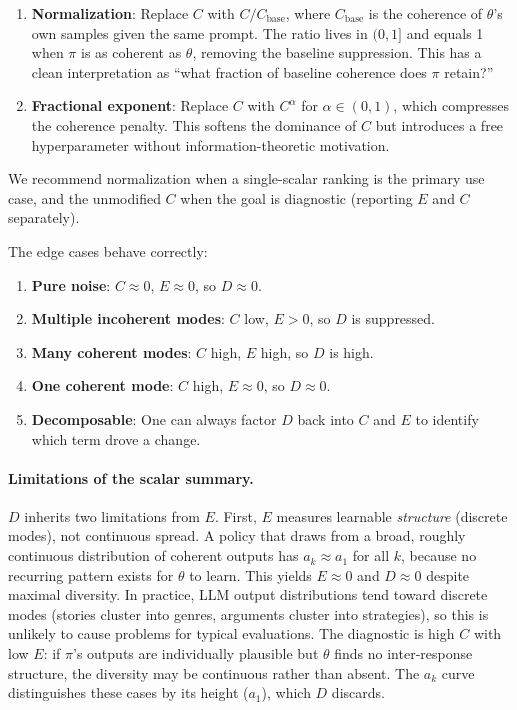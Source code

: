 \documentclass[11pt]{article}
\begin{document}
\begin{enumerate}[nosep]
    \item \textbf{Normalization}: Replace $C$ with $C / C_{\mathrm{base}}$, where $C_{\mathrm{base}}$ is the coherence of $\theta$'s own samples given the same prompt. The ratio lives in $(0, 1]$ and equals 1 when $\pi$ is as coherent as $\theta$, removing the baseline suppression. This has a clean interpretation as ``what fraction of baseline coherence does $\pi$ retain?''
    \item \textbf{Fractional exponent}: Replace $C$ with $C^\alpha$ for $\alpha \in (0, 1)$, which compresses the coherence penalty. This softens the dominance of $C$ but introduces a free hyperparameter without information-theoretic motivation.
\end{enumerate}

We recommend normalization when a single-scalar ranking is the primary use case, and the unmodified $C$ when the goal is diagnostic (reporting $E$ and $C$ separately).

The edge cases behave correctly:
\begin{enumerate}[nosep]
    \item \textbf{Pure noise}: $C \approx 0$, $E \approx 0$, so $D \approx 0$.
    \item \textbf{Multiple incoherent modes}: $C$ low, $E > 0$, so $D$ is suppressed.
    \item \textbf{Many coherent modes}: $C$ high, $E$ high, so $D$ is high.
    \item \textbf{One coherent mode}: $C$ high, $E \approx 0$, so $D \approx 0$.
    \item \textbf{Decomposable}: One can always factor $D$ back into $C$ and $E$ to identify which term drove a change.
\end{enumerate}

\paragraph{Limitations of the scalar summary.} $D$ inherits two limitations from $E$. First, $E$ measures learnable \emph{structure} (discrete modes), not continuous spread. A policy that draws from a broad, roughly continuous distribution of coherent outputs has $a_k \approx a_1$ for all $k$, because no recurring pattern exists for $\theta$ to learn. This yields $E \approx 0$ and $D \approx 0$ despite maximal diversity. In practice, LLM output distributions tend toward discrete modes (stories cluster into genres, arguments cluster into strategies), so this is unlikely to cause problems for typical evaluations. The diagnostic is high $C$ with low $E$: if $\pi$'s outputs are individually plausible but $\theta$ finds no inter-response structure, the diversity may be continuous rather than absent. The $a_k$ curve distinguishes these cases by its height ($a_1$), which $D$ discards.
\end{document}
